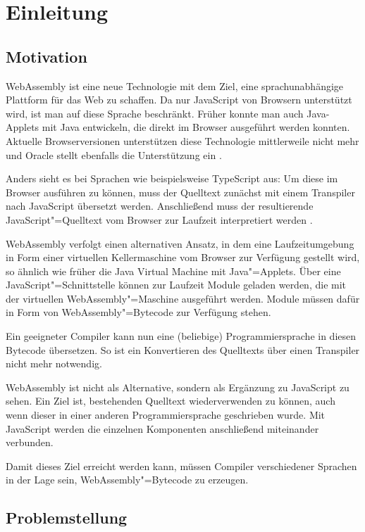 \chapter{Einleitung}

\section{Motivation}

WebAssembly \cite{WebAssemblyWebsite} ist eine neue Technologie mit dem Ziel, eine sprachunabhängige Plattform für das Web zu schaffen. Da nur JavaScript von Browsern unterstützt wird, ist man auf diese Sprache beschränkt. Früher konnte man auch Java-Applets mit Java entwickeln, die direkt im Browser ausgeführt werden konnten. Aktuelle Browserversionen unterstützen diese Technologie mittlerweile nicht mehr und Oracle stellt ebenfalls die Unterstützung ein \cite{OracleJavaSESupportRoadmap}.

Anders sieht es bei Sprachen wie beispielsweise TypeScript aus: Um diese im Browser ausführen zu können, muss der Quelltext zunächst mit einem Transpiler nach JavaScript übersetzt werden. Anschließend muss der resultierende JavaScript"=Quelltext vom Browser zur Laufzeit interpretiert werden \cite{TypeScript}.

WebAssembly verfolgt einen alternativen Ansatz, in dem eine Laufzeitumgebung in Form einer virtuellen Kellermaschine vom Browser zur Verfügung gestellt wird, so ähnlich wie früher die Java Virtual Machine mit Java"=Applets. Über eine JavaScript"=Schnittstelle können zur Laufzeit Module geladen werden, die mit der virtuellen WebAssembly"=Maschine ausgeführt werden. Module müssen dafür in Form von WebAssembly"=Bytecode zur Verfügung stehen.

Ein geeigneter Compiler kann nun eine (beliebige) Programmiersprache in diesen Bytecode übersetzen. So ist ein Konvertieren des Quelltexts über einen Transpiler nicht mehr notwendig.

WebAssembly ist nicht als Alternative, sondern als Ergänzung zu JavaScript zu sehen. Ein Ziel ist, bestehenden Quelltext wiederverwenden zu können, auch wenn dieser in einer anderen Programmiersprache geschrieben wurde. Mit JavaScript werden die einzelnen Komponenten anschließend miteinander verbunden.

Damit dieses Ziel erreicht werden kann, müssen Compiler verschiedener Sprachen in der Lage sein, WebAssembly"=Bytecode zu erzeugen.

\section{Problemstellung}

